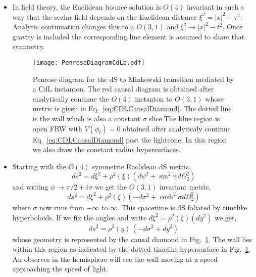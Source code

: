 \documentclass[a4paper,11pt]{article}
\numberwithin{equation}{section}
\begin{document}
\begin{itemize}
\item In field theory, the Euclidean bounce solution is  $O(4)$ invariant in such a way that the scalar field depends on the Euclidean distance 
$\xi^2=|x|^2+\tau^2$. Analytic continuation changes this to a $O(3,1)$ and $\xi^2\rightarrow |x|^2-t^2$. Once gravity is included the corresponding line element is assumed to share that symmetry. 
\begin{figure}[h!] 
\begin{center} 
\texttt{[image: PenroseDiagramCdLb.pdf]}
\caption{Penrose diagram for the dS to Minkowski transition mediated by a  CdL instanton. The red causal diagram is obtained after analytically continue the $O(4)$ instanton to $O(3,1)$ whose metric is given in Eq.~\eqref{eq:CDLCausalDiamond}. The dotted line is the wall which is also a  constant  $\sigma$ slice.The blue region is  open FRW with  $V(\phi_t)=0$ obtained after analyticaly continue Eq.~\eqref{eq:CDLCausalDiamond} past the lightcone. In this region we also draw the constant radius hypersurfaces.\label{fig:CdLPenroseDiagram}}
\end{center} 
\end{figure}

\item Starting with the $O(4)$ symmetric Euclidean dS  metric,
\begin{equation}
ds^2=d\xi^2+\rho^2(\xi)(d\psi^2+\sin^2\psi d\Omega_2^2)
\end{equation}
and  writing $\psi\to \pi/2+i\sigma$ we get the $O(3,1)$ invariant metric,
\begin{equation}
ds^2=d\xi^2+\rho^2(\xi)(-d\sigma^2+\cosh^2\sigma d\Omega_2^2)
\end{equation}  
where $\sigma$ now runs from $-\infty$ to $\infty$. This spacetime  is dS foliated by timelike hyperboloids.
If we fix the angles and write $d\xi^2=\rho^2(\xi)(dy^2)$ we get,
\begin{equation}
ds^2=\rho^2(y)\, (-d\sigma^2+dy^2) \label{eq:CDLCausalDiamond}
\end{equation}
whose geometry is represented by the causal diamond in Fig.~\ref{fig:CdLPenroseDiagram}. The wall lies within this region as indicated by the dotted timelike hypersurface in Fig.~\ref{fig:CdLPenroseDiagram}. An observer in the hemisphere will see the wall moving at a speed approaching the speed of light. 




\end{itemize}
\end{document}
